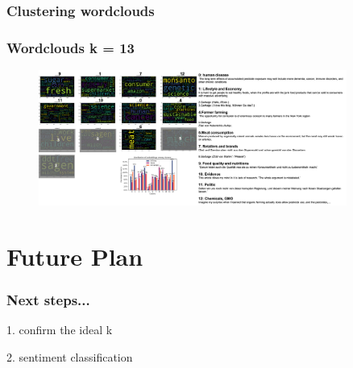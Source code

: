 \documentclass{tum-presentation}
\begin{document}
    \subsubsection{Clustering wordclouds}
    \begin{frame}[fragile]
      \frametitle{Wordclouds k = 13}

        \begin{center}
          \begin{figure}[t]
            \includegraphics[width=0.9\textwidth]{figures/example13.png}

          \end{figure}
        \end{center}
      
    
      \end{frame}
\section{Future Plan}
\begin{frame}
  \frametitle{Next steps...}
  \begin{description}
    \item 1. confirm the ideal k
    \item 2. sentiment classification
  \end{description}
 
\end{frame}
\end{document}
